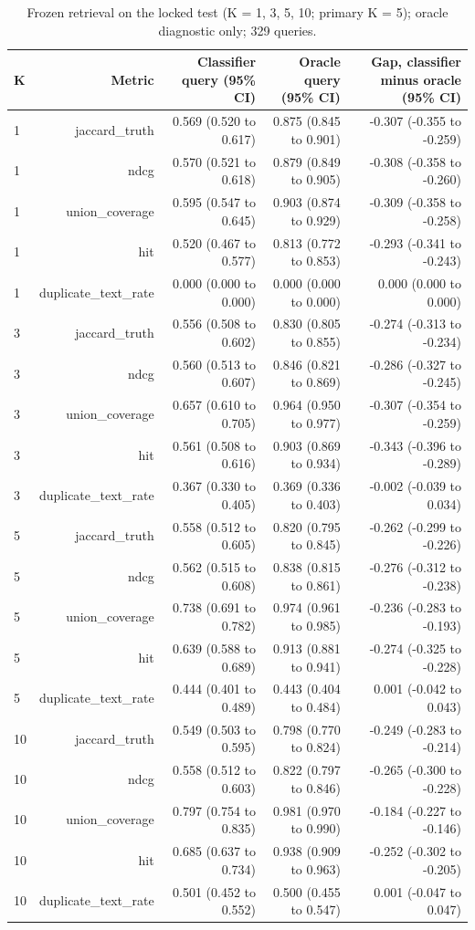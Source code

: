 \begin{table}[t]
\centering
\scriptsize
\begin{tabular}{lrrrr}
\hline
K & Metric & Classifier query (95\% CI) & Oracle query (95\% CI) & Gap, classifier minus oracle (95\% CI) \\
\hline
1 & jaccard\_truth & 0.569 (0.520 to 0.617) & 0.875 (0.845 to 0.901) & -0.307 (-0.355 to -0.259) \\
1 & ndcg & 0.570 (0.521 to 0.618) & 0.879 (0.849 to 0.905) & -0.308 (-0.358 to -0.260) \\
1 & union\_coverage & 0.595 (0.547 to 0.645) & 0.903 (0.874 to 0.929) & -0.309 (-0.358 to -0.258) \\
1 & hit & 0.520 (0.467 to 0.577) & 0.813 (0.772 to 0.853) & -0.293 (-0.341 to -0.243) \\
1 & duplicate\_text\_rate & 0.000 (0.000 to 0.000) & 0.000 (0.000 to 0.000) & 0.000 (0.000 to 0.000) \\
3 & jaccard\_truth & 0.556 (0.508 to 0.602) & 0.830 (0.805 to 0.855) & -0.274 (-0.313 to -0.234) \\
3 & ndcg & 0.560 (0.513 to 0.607) & 0.846 (0.821 to 0.869) & -0.286 (-0.327 to -0.245) \\
3 & union\_coverage & 0.657 (0.610 to 0.705) & 0.964 (0.950 to 0.977) & -0.307 (-0.354 to -0.259) \\
3 & hit & 0.561 (0.508 to 0.616) & 0.903 (0.869 to 0.934) & -0.343 (-0.396 to -0.289) \\
3 & duplicate\_text\_rate & 0.367 (0.330 to 0.405) & 0.369 (0.336 to 0.403) & -0.002 (-0.039 to 0.034) \\
5 & jaccard\_truth & 0.558 (0.512 to 0.605) & 0.820 (0.795 to 0.845) & -0.262 (-0.299 to -0.226) \\
5 & ndcg & 0.562 (0.515 to 0.608) & 0.838 (0.815 to 0.861) & -0.276 (-0.312 to -0.238) \\
5 & union\_coverage & 0.738 (0.691 to 0.782) & 0.974 (0.961 to 0.985) & -0.236 (-0.283 to -0.193) \\
5 & hit & 0.639 (0.588 to 0.689) & 0.913 (0.881 to 0.941) & -0.274 (-0.325 to -0.228) \\
5 & duplicate\_text\_rate & 0.444 (0.401 to 0.489) & 0.443 (0.404 to 0.484) & 0.001 (-0.042 to 0.043) \\
10 & jaccard\_truth & 0.549 (0.503 to 0.595) & 0.798 (0.770 to 0.824) & -0.249 (-0.283 to -0.214) \\
10 & ndcg & 0.558 (0.512 to 0.603) & 0.822 (0.797 to 0.846) & -0.265 (-0.300 to -0.228) \\
10 & union\_coverage & 0.797 (0.754 to 0.835) & 0.981 (0.970 to 0.990) & -0.184 (-0.227 to -0.146) \\
10 & hit & 0.685 (0.637 to 0.734) & 0.938 (0.909 to 0.963) & -0.252 (-0.302 to -0.205) \\
10 & duplicate\_text\_rate & 0.501 (0.452 to 0.552) & 0.500 (0.455 to 0.547) & 0.001 (-0.047 to 0.047) \\
\hline
\end{tabular}
\caption{Frozen retrieval on the locked test (K = 1, 3, 5, 10; primary K = 5); oracle diagnostic only; 329 queries.}
\label{tab:table4_final_retrieval_metrics}
\end{table}
